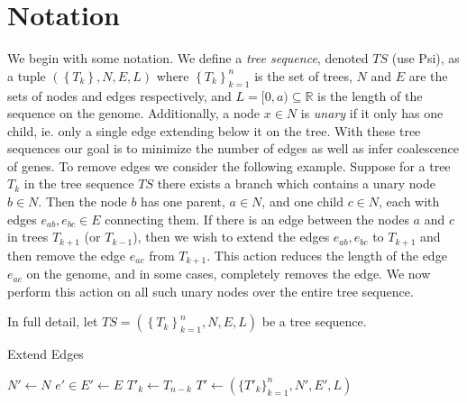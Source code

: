 \documentclass{article}
\newcommand{\R}{\mathbb{R}}
\begin{document}
\section{Notation}
    We begin with some notation. We define a \textit{tree sequence}, denoted $TS$ (use Psi), 
    as a tuple $\left( \left\{T_k\right\}, N, E, L\right)$ where
     $\left\{T_k\right\}_{k=1}^n$ is the set of trees,
     $N$ and $E$ are the sets of nodes and edges respectively,
     and $L=[0,a)\subseteq \R$ is the length of the sequence on the genome. 
    Additionally, a node $x\in N$ is \textit{unary} if it only has one child, 
    ie. only a single edge extending below it on the tree.
    With these tree sequences our goal is to
    minimize the number of edges
    as well as infer coalescence of genes. 
    To remove edges we consider the following example.
    Suppose for a tree $T_k$ in the tree sequence $TS$ 
    there exists a branch which contains a unary node $b\in N$.
    Then the node $b$ has one parent, $a\in N$, 
    and one child $c\in N$,
    each with edges $e_{ab}, e_{bc}\in E$ connecting them.
    If there is an edge between the nodes $a$ and $c$ in trees 
    $T_{k+1}$ (or $T_{k-1}$),
    then we wish to extend the edges $e_{ab},e_{bc}$ 
    to $T_{k+1}$ and then remove the edge $e_{ac}$ from $T_{k+1}$. 
    This action reduces the length of the edge $e_{ac}$ on the genome,
    and in some cases, completely removes the edge. 
    We now perform this action on all such unary nodes 
    over the entire tree sequence.


    In full detail, let $TS = \left( \left\{T_k\right\}_{k=1}^n, N, E, L\right)$
    be a tree sequence.


\begin{algorithm}  %
\caption{Extend Edges}\label{alg:cap}
\begin{algorithmic}
\State   $ N' \gets N$
\State   $ e'\in E' \gets E $
\State   $ T'_k \gets T_{n-k} $
\State   $ T' \gets (\{T'_k\}_{k=1}^n,N',E',L) $ 
\end{algorithmic}
\end{algorithm}
\end{document}
